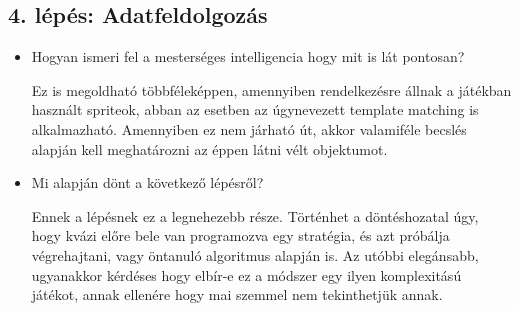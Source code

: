 \subsection{4. lépés: Adatfeldolgozás}

\begin{itemize}
    \item Hogyan ismeri fel a mesterséges intelligencia hogy mit is lát pontosan?
    
    Ez is megoldható többféleképpen, amennyiben rendelkezésre állnak a játékban használt spriteok, abban az esetben az úgynevezett template matching is alkalmazható. Amennyiben ez nem járható út, akkor valamiféle becslés alapján kell meghatározni az éppen látni vélt objektumot.

    \item Mi alapján dönt a következő lépésről?
    
    Ennek a lépésnek ez a legnehezebb része. Történhet a döntéshozatal úgy, hogy kvázi előre bele van programozva egy stratégia, és azt próbálja végrehajtani, vagy öntanuló algoritmus alapján is. Az utóbbi elegánsabb, ugyanakkor kérdéses hogy elbír-e ez a módszer egy ilyen komplexitású játékot, annak ellenére hogy mai szemmel nem tekinthetjük annak. 
\end{itemize}




